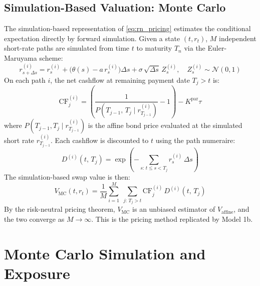   \subsection*{Simulation-Based Valuation: Monte Carlo}
  \label{sec:mc_pricing}

  The simulation-based representation of \eqref{eq:rn_pricing} estimates the conditional expectation directly by forward simulation. Given a state $(t, r_t)$, $M$ independent short-rate paths are simulated from time $t$ to maturity $T_n$ via the Euler-Maruyama scheme: 
  \begin{equation}
    r_{s+\Delta s}^{(i)}
      = r_s^{(i)}
        + \bigl(\theta(s) - a\,r_s^{(i)}\bigr)\Delta s
        + \sigma\,\sqrt{\Delta s}\,Z_s^{(i)},
    \quad Z_s^{(i)} \sim \mathcal{N}(0,1)
    \label{eq:euler_maruyama}
  \end{equation}
  On each path $i$, the net cashflow at remaining payment date $T_j > t$ is:
  \begin{equation}
    \mathrm{CF}_j^{(i)}
      = \left(\frac{1}{P\!\left(T_{j-1},\,T_j \mid r_{T_{j-1}}^{(i)}\right)} - 1\right)
        - K^{\mathrm{par}}\tau
    \label{eq:mc_cf}
  \end{equation}
  where $P(T_{j-1}, T_j \mid r_{T_{j-1}}^{(i)})$ is the affine bond price
  evaluated at the simulated short rate $r_{T_{j-1}}^{(i)}$. Each cashflow
  is discounted to $t$ using the path numeraire:
  \begin{equation}
    D^{(i)}(t,\,T_j)
      = \exp\!\left(-\sum_{s:\,t \leq s < T_j} r_s^{(i)}\,\Delta s\right)
    \label{eq:path_disc}
  \end{equation}
  The simulation-based swap value is then:
  \begin{equation}
    V_{\mathrm{MC}}(t, r_t)
      = \frac{1}{M}\sum_{i=1}^{M}\;\sum_{j:\,T_j > t}
          \mathrm{CF}_j^{(i)}\,D^{(i)}(t,\,T_j)
    \label{eq:irs_mc}
  \end{equation}
  By the risk-neutral pricing theorem, $V_{\mathrm{MC}}$ is an unbiased estimator of $V_{\mathrm{affine}}$, and the two converge as $M \to \infty$. This is the pricing method replicated by Model 1b.

  \section{Monte Carlo Simulation and Exposure}
  \label{sec:mc_exposure}

